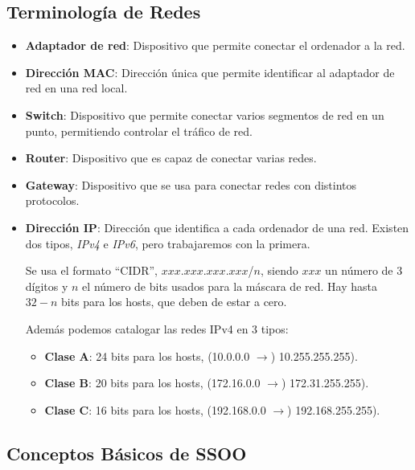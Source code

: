 \subsection{Terminología de Redes}
\begin{itemize}
        \item \textbf{Adaptador de red}: Dispositivo que permite conectar el ordenador a la red.
        \item \textbf{Dirección MAC}: Dirección única que permite identificar al adaptador de red en una red local.
        \item \textbf{Switch}: Dispositivo que permite conectar varios segmentos de red en un punto, permitiendo controlar el tráfico de red.
        \item \textbf{Router}: Dispositivo que es capaz de conectar varias redes.
        \item \textbf{Gateway}: Dispositivo que se usa para conectar redes con distintos protocolos.
        \item \textbf{Dirección IP}: Dirección que identifica a cada ordenador de una red. Existen dos tipos, \textit{IPv4} e \textit{IPv6}, pero trabajaremos con la primera. \par \noindent Se usa el formato ``CIDR'', \(xxx\).\(xxx\).\(xxx\).\(xxx\)/\(n\), siendo \(xxx\) un número de 3 dígitos y \(n\) el número de bits usados para la máscara de red. Hay hasta \(32-n\) bits para los hosts, que deben de estar a cero. \par \noindent Además podemos catalogar las redes IPv4 en 3 tipos:
              \begin{itemize}
                      \item  \textbf{Clase A}: 24 bits para los hosts, (10.0.0.0 \(\rightarrow\)) 10.255.255.255).\item  \textbf{Clase B}: 20 bits para los hosts, (172.16.0.0 \(\rightarrow\)) 172.31.255.255).\item \textbf{Clase C}: 16 bits para los hosts, (192.168.0.0 \(\rightarrow\)) 192.168.255.255).
              \end{itemize}
\end{itemize}
\subsection{Conceptos Básicos de SSOO}
